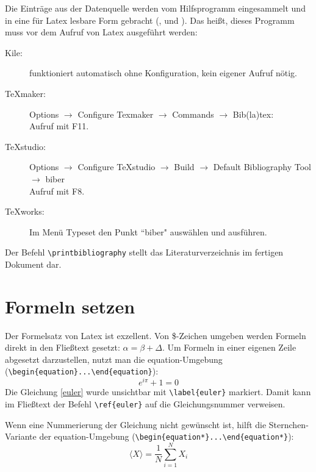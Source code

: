 \documentclass[ngerman]{scrartcl}
\begin{document}
Die Einträge aus der Datenquelle werden vom Hilfsprogramm  eingesammelt und in eine für Latex lesbare Form gebracht (,  und ). Das heißt, dieses Programm muss vor dem Aufruf von Latex ausgeführt werden:
\begin{description}
	\item [Kile:] funktioniert automatisch ohne Konfiguration, kein eigener Aufruf nötig.
	\item [TeXmaker:] Options $\rightarrow$ Configure Texmaker $\rightarrow$ Commands $\rightarrow$ Bib(la)tex:  \\
		Aufruf mit F11.
	\item [TeXstudio:] Options $\rightarrow$ Configure TeXstudio $\rightarrow$ Build $\rightarrow$ Default Bibliography Tool $\rightarrow$ biber \\
		Aufruf mit F8.
	\item [TeXworks:] Im Menü Typeset den Punkt ``biber" auswählen und ausführen.
\end{description}
Der Befehl \verb|\printbibliography| stellt das Literaturverzeichnis im fertigen Dokument dar.

\section{Formeln setzen}
Der Formelsatz von Latex ist exzellent. Von \$-Zeichen umgeben werden Formeln direkt in den Fließtext gesetzt: $\alpha = \beta + \Delta$. Um Formeln in einer eigenen Zeile abgesetzt darzustellen, nutzt man die equation-Umgebung
(\verb|\begin{equation}...\end{equation}|):
\begin{equation}
	e^{i \pi} + 1 = 0 \label{euler}
\end{equation}
Die Gleichung \ref{euler} wurde unsichtbar mit \verb|\label{euler}| markiert. Damit kann im Fließtext der Befehl \verb|\ref{euler}| auf die Gleichungsnummer  verweisen.

Wenn eine Nummerierung der Gleichung nicht gewünscht ist, hilft die Sternchen-Variante der equation-Umgebung (\verb|\begin{equation*}...\end{equation*}|):
\begin{equation*}
	\langle X\rangle =\frac{1}{N}\sum\limits_{i=1}^{N}X_i
\end{equation*}
\end{document}
